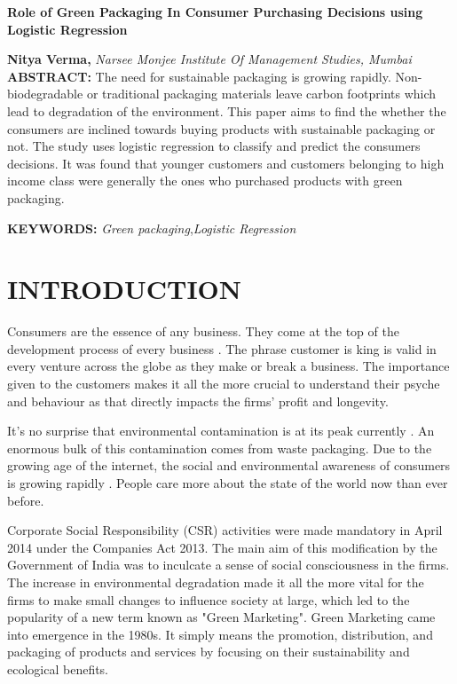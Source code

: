 \documentclass[a4paper,10pt]{article}
\begin{document}
\noindent 
\begin{center}
\textbf{{\Large Role of Green Packaging In Consumer Purchasing Decisions using Logistic Regression}} \\
\end{center}

\noindent 
\textbf{Nitya Verma,} \textit{Narsee Monjee Institute Of Management Studies, Mumbai}\\

\noindent 
\textbf{ABSTRACT: } The need for sustainable packaging is growing rapidly. Non-biodegradable or traditional packaging materials leave carbon footprints which lead to degradation of the environment. This paper aims to find the whether the consumers are inclined towards buying products with sustainable packaging or not. The study uses logistic regression to classify and predict the consumers decisions. It was found that younger customers and customers belonging to high income class were generally the ones who purchased products with green packaging. 
 

\noindent 
\textbf{KEYWORDS:} \textit{Green  packaging},\textit{Logistic Regression}

\section{INTRODUCTION}

Consumers are the essence of any business. They come at the top of the development process of every business \cite{Witek2020}. The phrase customer is king is valid in every venture across the globe as they make or break a business. The importance given to the customers makes it all the more crucial to understand their psyche and behaviour as that directly impacts the firms' profit and longevity. 

It's no surprise that environmental contamination is at its peak currently \cite{RaviVyas2023}. An enormous bulk of this contamination comes from waste packaging. Due to the growing age of the internet, the social and environmental awareness of consumers is growing rapidly \cite{Groening2018}. People care more about the state of the world now than ever before. 

Corporate Social Responsibility (CSR) activities were made mandatory in April 2014 under the Companies Act 2013. The main aim of this modification by the Government of India was to inculcate a sense of social consciousness in the firms. The increase in environmental degradation made it all the more vital for the firms to make small changes to influence society at large, which led to the popularity of a new term known as "Green Marketing". Green Marketing came into emergence in the 1980s. It simply means the promotion, distribution, and packaging of products and services by focusing on their sustainability and ecological benefits. 
\end{document}
